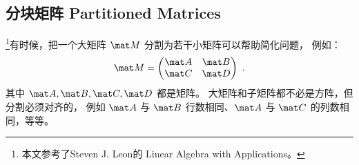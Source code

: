 
\begin{issues}
\issueDraft
\end{issues}

\subsection{分块矩阵 Partitioned Matrices}

\footnote{本文参考了Steven J. Leon的 Linear Algebra with Applications。}有时候，把一个大矩阵 $\mat M$ 分割为若干小矩阵可以帮助简化问题， 例如：
\begin{equation}
\mat M = 
\begin{pmatrix}
\mat A & \mat B\\
\mat C & \mat D\\
\end{pmatrix}~.
\end{equation}
其中 $\mat A, \mat B, \mat C, \mat D$ 都是矩阵。 大矩阵和子矩阵都不必是方阵，但分割必须对齐的， 例如 $\mat A$ 与 $\mat B$ 行数相同、$\mat A$ 与 $\mat C$ 的列数相同，等等。

